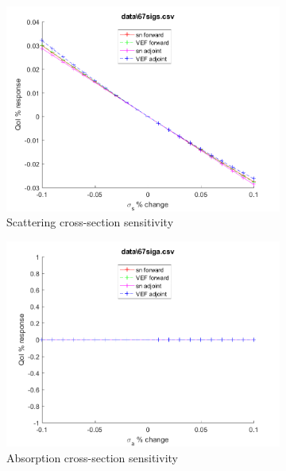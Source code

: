 \documentclass{article}
\begin{document}
\begin{figure}[H]
\begin{subfigure}{.5\textwidth}
  \includegraphics[width=.98\linewidth]{IanProposal/figures2/67sigsSens.png}
  \caption{Scattering cross-section sensitivity}
  \label{fig:sfig2}
\end{subfigure}%
\begin{subfigure}{.5\textwidth}
  \centering
  \includegraphics[width=.98\linewidth]{IanProposal/figures2/67sigaSens.png}
  \caption{Absorption cross-section sensitivity}
  \label{fig:sfig5}
\end{subfigure}%
\caption{}
\label{fig:fig}
\end{figure}
\newpage

\end{document}
